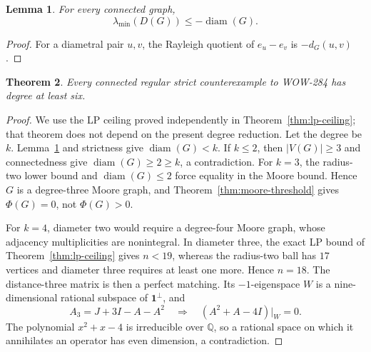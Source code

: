 \documentclass[a4paper,10pt,reqno]{amsart}
\theoremstyle{plain}
\newtheorem{theorem}{Theorem}[section]
\newtheorem{lemma}[theorem]{Lemma}
\theoremstyle{definition}
\theoremstyle{remark}
\newcommand{\one}{\mathbf 1}
\newcommand{\diam}{\operatorname{diam}}
\begin{document}
\begin{lemma}\label{lem:diam-rayleigh}
For every connected graph,
\[
 \lambda_{\min}(D(G))\le-\diam(G).
\]
\end{lemma}

\begin{proof}
For a diametral pair \(u,v\), the Rayleigh quotient of \(e_u-e_v\) is
\(-d_G(u,v)\).
\end{proof}

\begin{theorem}\label{thm:regular-degree-six}
Every connected regular strict counterexample to WOW-284 has degree at least
six.
\end{theorem}

\begin{proof}
We use the LP ceiling proved independently in
Theorem~\ref{thm:lp-ceiling}; that theorem does not depend on the present
degree reduction.  Let the degree be \(k\).
Lemma~\ref{lem:diam-rayleigh} and strictness give \(\diam(G)<k\).
If \(k\le2\), then \(|V(G)|\ge3\) and connectedness give
\(\diam(G)\ge2\ge k\), a contradiction.  For \(k=3\), the radius-two lower
bound and \(\diam(G)\le2\) force equality in the Moore bound.  Hence \(G\) is
a degree-three Moore graph, and Theorem~\ref{thm:moore-threshold} gives
\(\Phi(G)=0\), not \(\Phi(G)>0\).

For \(k=4\), diameter two would require a degree-four Moore graph, whose
adjacency multiplicities are nonintegral.  In diameter three, the exact LP
bound of Theorem~\ref{thm:lp-ceiling} gives \(n<19\), whereas the
radius-two ball has \(17\) vertices and diameter three requires at least one
more.  Hence \(n=18\).  The distance-three matrix is then a perfect matching.
Its \(-1\)-eigenspace \(W\) is a nine-dimensional rational subspace of
\(\one^\perp\), and
\[
 A_3=J+3I-A-A^2
 \quad\Longrightarrow\quad
 (A^2+A-4I)|_W=0.
\]
The polynomial \(x^2+x-4\) is irreducible over \(\mathbb Q\), so a rational
space on which it annihilates an operator has even dimension, a contradiction.


\end{proof}
\end{document}
